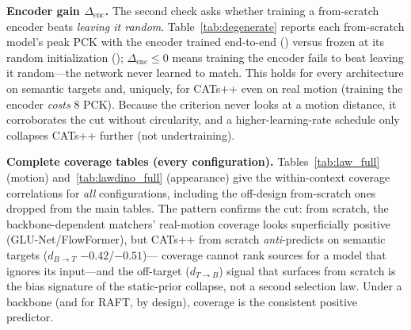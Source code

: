 \documentclass[runningheads]{llncs}
\newcommand{\dtb}{d_{T\to B}}
\newcommand{\dbt}{d_{B\to T}}
\newcommand{\pck}{PCK}
\newcommand{\enctrained}{\textcolor{orange!90!red}{\faFire}}
\newcommand{\encfrozen}{\textcolor{cyan!55!blue}{\faSnowflake[regular]}}
\begin{document}
\begin{table}[h]
\centering
\caption{\textbf{Source-sensitivity exposes the static-prior collapse} of
off-design from-scratch training. How far a from-scratch model's predicted flow
moves when the source image is swapped (target fixed), relative to its magnitude:
large $=$ a working matcher, $\to0$ $=$ a static prior that ignores the input.
\colorbox{green!16}{Green}: working ($5$--$9$ for GLU-Net/FlowFormer, \textbf{bold});
\colorbox{gray!15}{Gray}: collapsed ($\le0.5$). $^{\dagger}$CATs++ from scratch
still responds on real motion but transfers below random features
($\Delta_{\text{enc}}<0$, Table~\ref{tab:degenerate}).}
\label{tab:staticprior}
\footnotesize
\renewcommand{\arraystretch}{0.95}
\setlength{\tabcolsep}{5pt}

\end{table}

\noindent\textbf{Encoder gain $\Delta_{\text{enc}}$.} The second check asks
whether training a from-scratch encoder beats \emph{leaving it random}.
Table~\ref{tab:degenerate} reports each from-scratch model's peak \pck{} with the
encoder trained end-to-end (\enctrained) versus frozen at its random
initialization (\encfrozen); $\Delta_{\text{enc}}{\le}0$ means training the
encoder fails to beat leaving it random---the network never learned to match. This
holds for every architecture on semantic targets and, uniquely, for CATs++ even on
real motion (training the encoder \emph{costs} $8$ \pck). Because the criterion
never looks at a motion distance, it corroborates the cut without circularity, and
a higher-learning-rate schedule only collapses CATs++ further (not undertraining).

\begin{table}[h]
\centering
\caption{\textbf{Does training the backbone from scratch beat \emph{not} training
it? ($\Delta_{\text{enc}}$).} \emph{Both} encoders start from the same random
initialization---no pretrained weights anywhere. $\Delta_{\text{enc}}{\le}0$
(\textbf{bold}) means training a random encoder fails to beat leaving it random
(\emph{not} that a pretrained encoder underperforms).}
\label{tab:degenerate}
\small
\setlength{\tabcolsep}{3pt}

\end{table}

\noindent\textbf{Complete coverage tables (every configuration).}
Tables~\ref{tab:law_full} (motion) and~\ref{tab:lawdino_full} (appearance) give
the within-context coverage correlations for \emph{all} configurations, including
the off-design from-scratch ones dropped from the main tables. The pattern
confirms the cut: from scratch, the backbone-dependent matchers' real-motion
coverage looks superficially positive (GLU-Net/FlowFormer), but CATs++ from
scratch \emph{anti}-predicts on semantic targets ($\dbt$ $-0.42$/$-0.51$)---%
coverage cannot rank sources for a model that ignores its input---and the
off-target ($\dtb$) signal that surfaces from scratch is the bias signature of the
static-prior collapse, not a second selection law. Under a backbone (and for
RAFT, by design), coverage is the consistent positive predictor.
\end{document}
